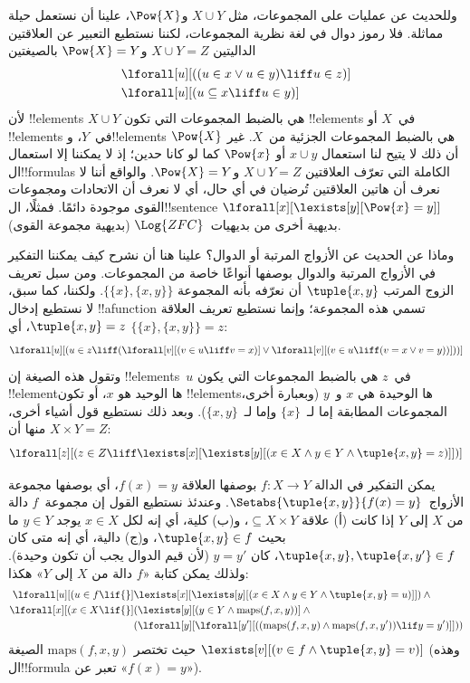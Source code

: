 \documentclass[../../../include/open-logic-section]{subfiles}
\begin{document}
وللحديث عن عمليات على المجموعات، مثل $X \cup Y$ و$\Pow{X}$، علينا
أن نستعمل حيلة مماثلة. فلا رموز دوال في لغة نظرية المجموعات، لكننا
نستطيع التعبير عن العلاقتين الداليتين $X \cup Y = Z$ و$\Pow{X} = Y$
بالصيغتين
\begin{align*}
& \lforall[u][((u \in x \lor u \in y) \liff u \in z)]\\
& \lforall[u][(u \subseteq x \liff u \in y )]
\end{align*}
لأن !!{element}s $X \cup Y$ هي بالضبط المجموعات التي تكون
!!{element}s في~$X$ أو !!{element}s في~$Y$، و!!{element}s
$\Pow{X}$ هي بالضبط المجموعات الجزئية من~$X$. غير أن ذلك لا يتيح لنا
استعمال $x \cup y$ أو $\Pow{x}$ كما لو كانا حدين؛ إذ لا يمكننا إلا
استعمال ال!!{formula}s الكاملة التي تعرّف العلاقتين $X \cup Y = Z$
و$\Pow{X} = Y$. والواقع أننا لا نعرف أن هاتين العلاقتين تُرضيان في
أي حال، أي لا نعرف أن الاتحادات ومجموعات القوى موجودة دائمًا. فمثلًا،
ال!!{sentence} $\lforall[x][\lexists[y][\Pow{x} = y]]$ بديهية أخرى
من بديهيات~$\Log{ZFC}$ (بديهية مجموعة القوى).

وماذا عن الحديث عن الأزواج المرتبة أو الدوال؟ علينا هنا أن نشرح كيف
يمكننا التفكير في الأزواج المرتبة والدوال بوصفها أنواعًا خاصة من
المجموعات. ومن سبل تعريف الزوج المرتب $\tuple{x, y}$ أن نعرّفه بأنه
المجموعة $\{\{x\}, \{x, y\}\}$. ولكننا، كما سبق، لا نستطيع إدخال
!!a{function} تسمي هذه المجموعة؛ وإنما نستطيع تعريف العلاقة
$\tuple{x, y} = z$، أي $\{\{x\}, \{x, y\}\} = z$:
\[
\lforall[u][(u \in z \liff (\lforall[v][(v \in u \liff v = x)] \lor
  \lforall[v][(v \in u \liff (v = x \lor v = y))]))]
\]
وتقول هذه الصيغة إن !!{element}s~$u$ في~$z$ هي بالضبط المجموعات التي
يكون !!{element}ها الوحيد هو $x$، أو تكون !!{element}sها الوحيدة هي
$x$ و~$y$ (وبعبارة
أخرى، المجموعات المطابقة إما لـ~$\{x\}$ وإما لـ~$\{x, y\}$). وبعد
ذلك نستطيع قول أشياء أخرى، منها أن $X \times Y = Z$:
\[
\lforall[z][(z \in Z \liff \lexists[x][\lexists[y][(x \in
        X \land y \in Y \land \tuple{x, y} = z)]])]
\]

يمكن التفكير في الدالة $f \colon X \to Y$ بوصفها العلاقة $f(x)
= y$، أي بوصفها مجموعة الأزواج~$\Setabs{\tuple{x,y}}{f(x) = y}$.
وعندئذ نستطيع القول إن مجموعة~$f$ دالة من $X$ إلى $Y$ إذا كانت (أ)
علاقة $\subseteq X \times Y$، و(ب) كلية، أي إنه لكل $x \in X$ يوجد
$y \in Y$ ما بحيث $\tuple{x, y} \in f$، و(ج) دالية، أي إنه متى كان
$\tuple{x, y}, \tuple{x, y'} \in f$، كان $y = y'$ (لأن قيم الدوال
يجب أن تكون وحيدة). ولذلك يمكن كتابة «$f$ دالة من $X$ إلى $Y$» هكذا:
\begin{align*}
 \lforall[u][(u \in f \lif {}] & \lexists[x][\lexists[y][(x \in X \land y \in
      Y \land \tuple{x, y} = u)]]) \land {}\\
 \lforall[x][(x \in X \lif {}] &
      (\lexists[y][(y \in Y \land \mathrm{maps}(f, x, y))] \land {}\\
& (\lforall[y][\lforall[y'][((\mathrm{maps}(f, x, y) \land
    \mathrm{maps}(f, x, y')) \lif y = y')]]))
\end{align*}
حيث تختصر $\mathrm{maps}(f, x, y)$ الصيغة $\lexists[v][(v \in f \land
  \tuple{x, y} = v)]$ (وهذه ال!!{formula} تعبر عن «$f(x) = y$»).
\end{document}
